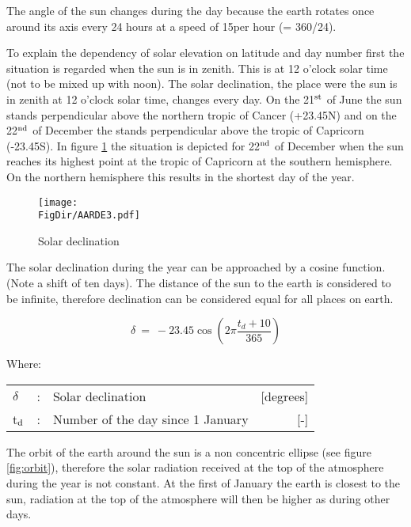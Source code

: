The angle of the sun changes during the day because the earth rotates once around its axis
every 24 hours at a speed of 15\degrees per hour (= 360/24).  

To explain the dependency of solar elevation on latitude and day number first the situation
is regarded when the sun is in zenith. This is at 12 o'clock solar time (not to be mixed up
with noon). The solar declination, the place were the sun is in zenith at 12 o'clock solar
time, changes every day. On the 21$^{\rm st}$ of June the sun stands perpen\-dicular above 
the northern tropic of Cancer (+23.45\degrees N) and on the 22$^{\rm nd}$ of December the 
stands perpendicular above the tropic of Capricorn (-23.45\degrees S). In figure 
\ref{fig:solardecl} the situation is depicted for 22$^{\rm nd}$ of December when the sun 
reaches its highest point at the tropic of Capricorn at the southern hemisphere. On the 
northern hemisphere this results in the shortest day of the year.

\begin{figure}[p]
	\centering
	\texttt{[image: \\FigDir/AARDE3.pdf]}
	\caption{Solar declination}
	\label{fig:solardecl}
\end{figure}

The solar declination during the year can be approached by a cosine function. (Note a shift of ten days).
The distance of the sun to the earth is considered to be infinite, therefore declination 
can be considered equal for all places on earth.

\begin{equation}
\delta ~=~ -23.45 \cos ( 2 \pi {\frac{t _{d} + 10}{365}} )
\end{equation}

Where:\\[5pt]
\begin{tabularx}{\textwidth}{llXr}
	$\delta$ &:& Solar declination   & [de\-grees]\\
	t$_{{\rm d}}$ &:& Number of the day since 1 January   & [-]\\
\end{tabularx}

The orbit of the earth around the sun is a
non concentric ellipse (see figure \ref{fig:orbit}), therefore the solar radiation received 
at the top of the atmosphere during the year is not constant. At the first of January the 
earth is closest to the sun, radiation at the top of the atmosphere will then be higher as 
during other days.

